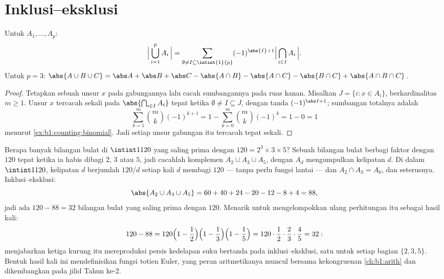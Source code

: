 \section{Inklusi--eksklusi}

\begin{theorem}\label{thm:b1:counting:inclexcl}
Untuk  $A_1, \dots, A_p$:
\[
\Bigl|\, \bigcup_{i=1}^{p} A_i \,\Bigr|
= \sum_{\emptyset \neq I \subseteq \intint{1}{p}}
(-1)^{\abs{I}+1} \Bigl|\, \bigcap_{i \in I} A_i \,\Bigr| .
\]
Untuk $p = 3$:
$\abs{A \cup B \cup C} = \abs A + \abs B + \abs C - \abs{A \cap B} -
\abs{A \cap C} - \abs{B \cap C} + \abs{A \cap B \cap C}$.
\end{theorem}

\begin{proof}
Tetapkan sebuah unsur $x$ pada gabungannya lalu cacah sumbangannya pada
ruas kanan. Misalkan $J = \{i : x \in A_i\}$, berkardinalitas $m \geq
1$. Unsur $x$ tercacah sekali pada $\abs{\bigcap_{i \in I} A_i}$
tepat ketika $\emptyset \neq I \subseteq J$, dengan tanda
$(-1)^{\abs I + 1}$; sumbangan totalnya adalah
\[
\sum_{k=1}^{m} \binom{m}{k} (-1)^{k+1}
= 1 - \sum_{k=0}^{m} \binom mk (-1)^k = 1 - 0 = 1
\]
menurut \cref{ex:b1:counting:binomial}. Jadi setiap unsur gabungan itu
tercacah tepat sekali.
\end{proof}

\begin{example}\label{ex:b1:counting:coprime}
Berapa banyak bilangan bulat di $\intint1{120}$ yang saling prima dengan $120 = 2^3
\times 3 \times 5$? Sebuah bilangan bulat berbagi faktor dengan $120$ tepat
ketika ia habis dibagi $2$, $3$ atau $5$, jadi cacahlah komplemen
$A_2 \cup A_3 \cup A_5$, dengan $A_d$ mengumpulkan kelipatan
$d$. Di dalam $\intint1{120}$, kelipatan $d$ berjumlah $120/d$
setiap kali $d$ membagi $120$ --- tanpa perlu fungsi lantai --- dan
$A_2 \cap A_3 = A_6$, dan seterusnya. Inklusi--eksklusi:
\[
\abs{A_2 \cup A_3 \cup A_5}
= 60 + 40 + 24 - 20 - 12 - 8 + 4 = 88 ,
\]
jadi ada $120 - 88 = 32$ bilangan bulat yang saling prima dengan $120$. Menarik
untuk mengelompokkan ulang perhitungan itu sebagai hasil kali:
\[
120 - 88 = 120\Bigl(1 - \frac12\Bigr)\Bigl(1 -
\frac13\Bigr)\Bigl(1 - \frac15\Bigr) = 120 \cdot \frac12 \cdot
\frac23 \cdot \frac45 = 32 :
\]
menjabarkan ketiga kurung itu mereproduksi persis kedelapan
suku bertanda pada inklusi--eksklusi, satu untuk setiap  bagian $\{2, 3,
5\}$. Bentuk hasil kali ini mendefinisikan fungsi totien Euler, yang peran
aritmetikanya muncul bersama kekongruenan \cref{ch:b1:arith} dan
dikembangkan pada jilid Tahun ke-2.
\end{example}

